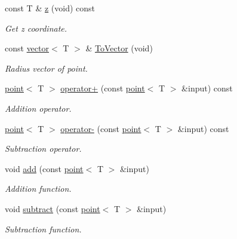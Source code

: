 \begin{DoxyCompactItemize}
\mbox{\label{classddd_1_1point_aeb266a3811a70700ee7d52cacfdc0b9f}} 
const T \& \hyperlink{classddd_1_1point_aeb266a3811a70700ee7d52cacfdc0b9f}{z} (void) const
\begin{DoxyCompactList}\small\item\em Get z coordinate. \end{DoxyCompactList}\item 
\mbox{\label{classddd_1_1point_a3d8e57af2dfe4b200dc2b7ca63ff554a}} 
const \hyperlink{classddd_1_1vector}{vector}$<$ T $>$ \& \hyperlink{classddd_1_1point_a3d8e57af2dfe4b200dc2b7ca63ff554a}{To\+Vector} (void)
\begin{DoxyCompactList}\small\item\em Radius vector of point. \end{DoxyCompactList}\item 
\hyperlink{classddd_1_1point}{point}$<$ T $>$ \hyperlink{classddd_1_1point_ab0b0c990b117bb889d34d44509b645be}{operator+} (const \hyperlink{classddd_1_1point}{point}$<$ T $>$ \&input) const
\begin{DoxyCompactList}\small\item\em Addition operator. \end{DoxyCompactList}\item 
\hyperlink{classddd_1_1point}{point}$<$ T $>$ \hyperlink{classddd_1_1point_a5621f5a883c88d5588e09f9ff0de6575}{operator-\/} (const \hyperlink{classddd_1_1point}{point}$<$ T $>$ \&input) const
\begin{DoxyCompactList}\small\item\em Subtraction operator. \end{DoxyCompactList}\item 
void \hyperlink{classddd_1_1point_a66ad14a1d50eb4170c874f75b77e8b0b}{add} (const \hyperlink{classddd_1_1point}{point}$<$ T $>$ \&input)
\begin{DoxyCompactList}\small\item\em Addition function. \end{DoxyCompactList}\item 
void \hyperlink{classddd_1_1point_abf2e2ea5474534eb17d1cb6bd96b7913}{subtract} (const \hyperlink{classddd_1_1point}{point}$<$ T $>$ \&input)
\begin{DoxyCompactList}\small\item\em Subtraction function. \end{DoxyCompactList}\item 

\end{DoxyCompactItemize}
